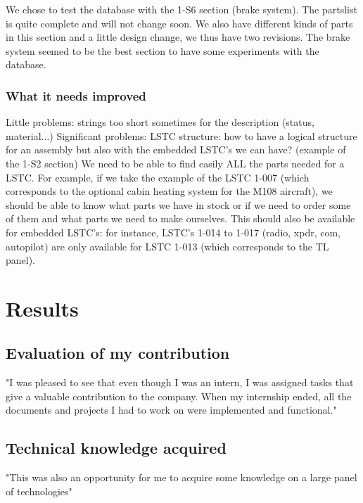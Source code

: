 \documentclass[11pt,a4paper]{report}
\begin{document}
We chose to test the database with the 1-S6 section (brake system). The partslist is quite complete and will not change soon. We also have different kinds of parts in this section and a little design change, we thus have two revisions. The brake system seemed to be the best section to have some experiments with the database.

\subsubsection{What it needs improved}
Little problems: strings too short sometimes for the description (status, material...)
Significant problems: LSTC structure: how to have a logical structure for an assembly but also with the embedded LSTC's we can have? (example of the 1-S2 section)
We need to be able to find easily ALL the parts needed for a LSTC. For example, if we take the example of the LSTC 1-007 (which corresponds to the optional cabin heating system for the M108 aircraft), we should be able to know what parts we have in stock or if we need to order some of them and what parts we need to make ourselves.
This should also be available for embedded LSTC's: for instance, LSTC's 1-014 to 1-017 (radio, xpdr, com, autopilot) are only available for LSTC 1-013 (which corresponds to the TL panel).


\newpage

\section{Results}
\subsection{Evaluation of my contribution}
  "I was pleased to see that even though I was an intern, I was assigned tasks that give a valuable contribution to the company. When my internship ended, all the documents and projects I had to work on were implemented and functional."

\subsection{Technical knowledge acquired}
"This was also an opportunity for me to acquire some knowledge on a large panel of technologies"
\end{document}
